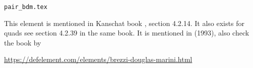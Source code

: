 \begin{flushright} {\tiny {\color{gray} \tt  pair\_bdm.tex}} \end{flushright}

This element is mentioned in Kanschat book \cite{kanschat}, section 4.2.14. 
It also exists for quads see section 4.2.39 in the same book.
It is mentioned in \textcite{chen93a} (1993), also check the book by \textcite{brfo}

\begin{center}
\url{https://defelement.com/elements/brezzi-douglas-marini.html}
\end{center}
